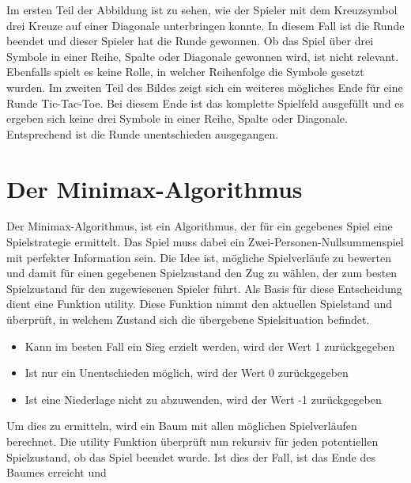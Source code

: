 Im ersten Teil der Abbildung ist zu sehen, wie der Spieler mit dem Kreuzsymbol drei Kreuze auf einer Diagonale unterbringen
konnte. In diesem Fall ist die Runde beendet und dieser Spieler hat die Runde gewonnen. Ob das Spiel über drei Symbole in einer
Reihe, Spalte oder Diagonale gewonnen wird, ist nicht relevant. Ebenfalls spielt es keine Rolle, in welcher Reihenfolge die 
Symbole gesetzt wurden. Im zweiten Teil des Bildes zeigt sich ein weiteres mögliches Ende für eine Runde Tic-Tac-Toe. Bei diesem
Ende ist das komplette Spielfeld ausgefüllt und es ergeben sich keine drei Symbole in einer Reihe, Spalte oder Diagonale. 
Entsprechend ist die Runde unentschieden ausgegangen.

\section{Der Minimax-Algorithmus}

Der Minimax-Algorithmus, ist ein Algorithmus, der für ein gegebenes Spiel eine Spielstrategie ermittelt. 
Das Spiel muss dabei ein Zwei-Personen-Nullsummenspiel mit perfekter Information sein. Die Idee ist, mögliche 
Spielverläufe zu bewerten und damit für einen gegebenen Spielzustand den Zug zu wählen, der zum besten Spielzustand 
für den zugewiesenen Spieler führt. Als Basis für diese Entscheidung dient eine Funktion utility. Diese Funktion 
nimmt den aktuellen Spielstand und überprüft, in welchem Zustand sich die übergebene Spielsituation befindet. 

\begin{itemize}
    \item Kann im besten Fall ein Sieg erzielt werden, wird der Wert 1 zurückgegeben
    \item Ist nur ein Unentschieden möglich, wird der Wert 0 zurückgegeben
    \item Ist eine Niederlage nicht zu abzuwenden, wird der Wert -1 zurückgegeben
\end{itemize}

Um dies zu ermitteln, wird ein Baum mit allen möglichen Spielverläufen berechnet. Die utility Funktion überprüft 
nun rekursiv für jeden potentiellen Spielzustand, ob das Spiel beendet wurde. Ist dies der Fall, ist das 
Ende des Baumes erreicht und 